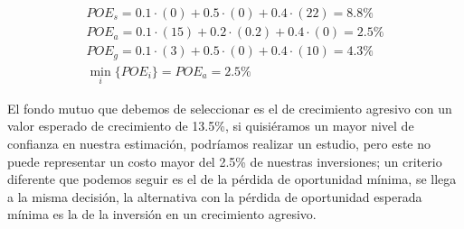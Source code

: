 \documentclass{article}
\begin{document}
            \begin{gather*}
                POE_s = 0.1 \cdot (0) + 0.5 \cdot (0) + 0.4 \cdot (22) = 8.8 \% \\
                POE_a = 0.1 \cdot (15) + 0.2 \cdot (0.2) + 0.4 \cdot (0) = 2.5 \% \\
                POE_g = 0.1 \cdot (3) + 0.5 \cdot (0) + 0.4 \cdot (10) = 4.3 \% \\
                \min_i \{POE_i\} = POE_a = 2.5 \%
            \end{gather*}
            
        El fondo mutuo que debemos de seleccionar es el de crecimiento agresivo con un valor esperado de crecimiento de 13.5\%, si quisiéramos un mayor nivel de confianza en nuestra estimación, podríamos realizar un estudio, pero este no puede representar un costo mayor del 2.5\% de nuestras inversiones; un criterio diferente que podemos seguir es el de la pérdida de oportunidad mínima, se llega a la misma decisión, la alternativa con la pérdida de oportunidad esperada mínima es la de la inversión en un crecimiento agresivo.
\end{document}
